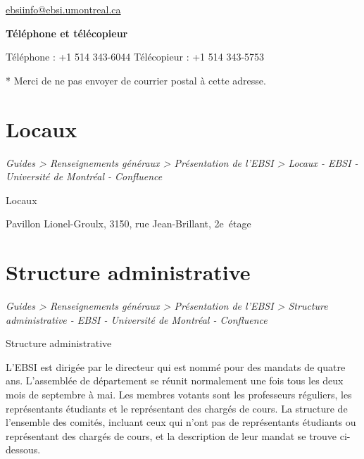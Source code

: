 \documentclass [12 pt]{article}
\begin{document}
            
            
                
        \href{
        mailto:ebsiinfo@ebsi.umontreal.ca
        } {
        ebsiinfo@ebsi.umontreal.ca
        }
    
            
            
        \textbf{
        Téléphone et télécopieur
        }
    
            Téléphone : +1 514 343-6044
            Télécopieur : +1 514 343-5753
        
        
            
            * Merci de ne pas envoyer de courrier postal à cette adresse.
        
    
    
        \newpage
        \section {
        Locaux
        }
        
        
        
        \textit{
        Guides > Renseignements généraux > Présentation de l'EBSI > Locaux -
            EBSI - Université de Montréal - Confluence
        }
    
        Locaux
        
            
                Pavillon Lionel-Groulx, 3150, rue Jean-Brillant,
                    2e étage
            
            
                
                    
                
            
        
    
    
        \newpage
        \section {
        Structure administrative
        }
        
        
        
        \textit{
        Guides > Renseignements généraux > Présentation de l'EBSI > Structure
            administrative - EBSI - Université de Montréal - Confluence
        }
    
        Structure administrative
        
            L'EBSI est dirigée par le directeur qui est nommé pour des mandats de quatre ans.
                L'assemblée de département se réunit normalement une fois tous les deux mois de
                septembre à mai. Les membres votants sont les professeurs réguliers, les
                représentants étudiants et le représentant des chargés de cours.
            La structure de l'ensemble des comités, incluant ceux qui n'ont pas de représentants
                étudiants ou représentant des chargés de cours, et la description de leur mandat se
                trouve ci-dessous.
            
\end{document}
